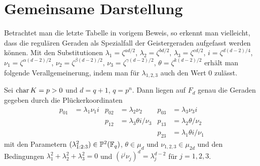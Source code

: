 \section{Gemeinsame Darstellung}
Betrachtet man die letzte Tabelle in vorigem Beweis, so erkennt man vielleicht, dass die regulären Geraden als Spezialfall der Geistergeraden aufgefasst werden können. Mit den Substitutionen $\lambda_1 = \zeta^{ad/2}$, $\lambda_2 = \zeta^{bd/2}$, $\lambda_3 = \zeta^{cd/2}$, $i = \zeta^{d(d-2)/4}$, $\nu_1 = \zeta^{\alpha(d-2)/2}$, $\nu_2 = \zeta^{\beta(d-2)/2}$, $\nu_3 = \zeta^{\gamma(d-2)/2}$, $\theta = \zeta^{k(d-2)/2}$ erhält man folgende Verallgemeinerung, indem man für $\lambda_{1,2,3}$ auch den Wert $0$ zulässt.
\begin{coroll}
Sei $\operatorname{char} K = p > 0$ und $d = q+1$, $q = p^n$. Dann liegen auf $F_d$ genau die Geraden gegeben durch die Plückerkoordinaten
\begin{align*}
p_{01} &= \lambda_1 \nu_1 i &p_{02} &= \lambda_2 \nu_2 &p_{03} &= \lambda_3 \nu_3 i \\
 & &p_{12} &= \lambda_3 \theta i / \nu_3 &p_{13} &= \lambda_2 \theta / \nu_2 \\
 & & & &p_{23} &= \lambda_1 \theta i / \nu_1
\end{align*}
mit den Parametern $(\lambda_{1:2:3}^2) \in \mathbb P^{2}(\mathbb F_q)$, $\theta \in \mu_d$ und $\nu_{1,2,3} \in \mu_{2d}$ und den Bedingungen $\lambda_1^2 + \lambda_2^2 + \lambda_3^2 = 0$ und $(i^j \nu_j)^d = \lambda_j^{d-2}$ für $j=1,2,3$.
\end{coroll}

